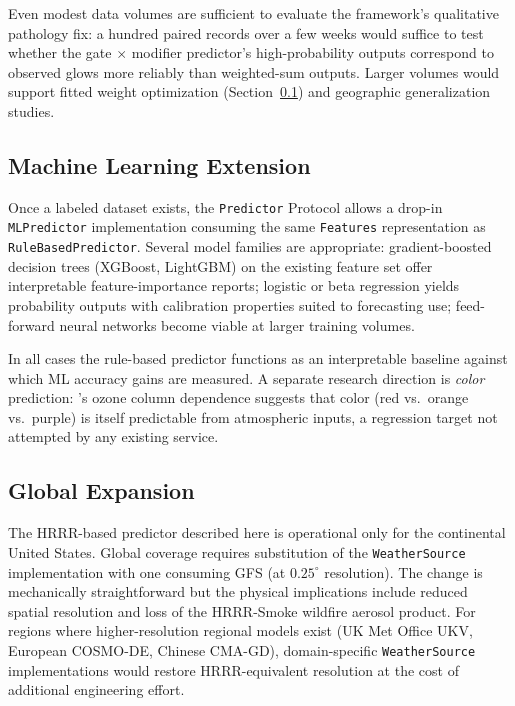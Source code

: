 \documentclass[11pt,a4paper]{article}
\begin{document}
Even modest data volumes are sufficient to evaluate the framework's qualitative pathology fix: a hundred paired records over a few weeks would suffice to test whether the gate $\times$ modifier predictor's high-probability outputs correspond to observed glows more reliably than weighted-sum outputs. Larger volumes would support fitted weight optimization (Section~\ref{sec:mlext}) and geographic generalization studies.

\subsection{Machine Learning Extension}
\label{sec:mlext}

Once a labeled dataset exists, the \texttt{Predictor} Protocol allows a drop-in \texttt{MLPredictor} implementation consuming the same \texttt{Features} representation as \texttt{RuleBasedPredictor}. Several model families are appropriate: gradient-boosted decision trees (XGBoost, LightGBM) on the existing feature set offer interpretable feature-importance reports; logistic or beta regression yields probability outputs with calibration properties suited to forecasting use; feed-forward neural networks become viable at larger training volumes.

In all cases the rule-based predictor functions as an interpretable baseline against which ML accuracy gains are measured. A separate research direction is \emph{color} prediction: \citet{lange2023revisiting}'s ozone column dependence suggests that color (red vs.\ orange vs.\ purple) is itself predictable from atmospheric inputs, a regression target not attempted by any existing service.

\subsection{Global Expansion}
\label{sec:globalext}
\label{sec:future}

The HRRR-based predictor described here is operational only for the continental United States. Global coverage requires substitution of the \texttt{WeatherSource} implementation with one consuming GFS (at $0.25^\circ$ resolution). The change is mechanically straightforward but the physical implications include reduced spatial resolution and loss of the HRRR-Smoke wildfire aerosol product. For regions where higher-resolution regional models exist (UK Met Office UKV, European COSMO-DE, Chinese CMA-GD), domain-specific \texttt{WeatherSource} implementations would restore HRRR-equivalent resolution at the cost of additional engineering effort.
\end{document}
